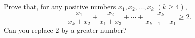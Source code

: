 Prove that, for any positive numbers $x_1, x_2, \ldots, x_k$ $(k \geq 4)$,
\[ \frac{x_1}{x_k + x_2} + \frac{x_2}{x_1 + x_3} + \cdots + \frac{x_k}{x_{k-1} + x_1} \geq 2. \]
Can you replace $2$ by a greater number?
